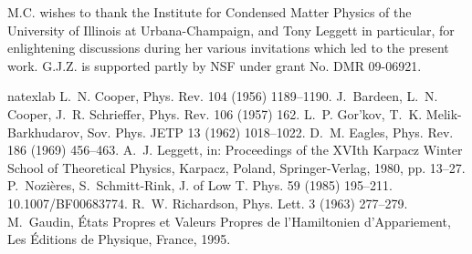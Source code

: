 \documentclass[5p,twocolumn]{elsarticle}
\begin{document}
M.C. wishes to thank the Institute for Condensed Matter Physics of the University of Illinois at
Urbana-Champaign, and Tony Leggett in particular, for enlightening discussions during her various invitations which led to the present work. G.J.Z. is supported partly by NSF under grant No. DMR 09-06921.  


%
\begin{thebibliography}{16}
\expandafter\ifx\csname natexlab\endcsname\relax\def\natexlab#1{#1}\fi
\providecommand{\bibinfo}[2]{#2}
\ifx\xfnm\relax \def\xfnm[#1]{\unskip,\space#1}\fi
\bibinfo{author}{L.~N. Cooper}, \bibinfo{journal}{Phys. Rev.}
  \bibinfo{volume}{104} (\bibinfo{year}{1956}) \bibinfo{pages}{1189--1190}.
\bibinfo{author}{J.~Bardeen}, \bibinfo{author}{L.~N. Cooper},
  \bibinfo{author}{J.~R. Schrieffer}, \bibinfo{journal}{Phys. Rev.}
  \bibinfo{volume}{106} (\bibinfo{year}{1957}) \bibinfo{pages}{162}.
\bibinfo{author}{L.~P. {Gor'kov}}, \bibinfo{author}{T.~K. Melik-Barkhudarov},
  \bibinfo{journal}{Sov. Phys. JETP} \bibinfo{volume}{13}
  (\bibinfo{year}{1962}) \bibinfo{pages}{1018--1022}.
\bibinfo{author}{D.~M. Eagles}, \bibinfo{journal}{Phys. Rev.}
  \bibinfo{volume}{186} (\bibinfo{year}{1969}) \bibinfo{pages}{456--463}.
\bibinfo{author}{A.~J. Leggett}, in: \bibinfo{booktitle}{Proceedings of the
  XVIth Karpacz Winter School of Theoretical Physics, Karpacz, Poland},
  \bibinfo{publisher}{Springer-Verlag}, \bibinfo{year}{1980}, pp.
  \bibinfo{pages}{13--27}.
\bibinfo{author}{P.~Nozi\`{e}res}, \bibinfo{author}{S.~Schmitt-Rink},
  \bibinfo{journal}{J. of Low T. Phys.} \bibinfo{volume}{59}
  (\bibinfo{year}{1985}) \bibinfo{pages}{195--211}.
  \bibinfo{note}{10.1007/BF00683774}.
\bibinfo{author}{R.~W. Richardson}, \bibinfo{journal}{Phys. Lett.}
  \bibinfo{volume}{3} (\bibinfo{year}{1963}) \bibinfo{pages}{277--279}.
\bibinfo{author}{M.~Gaudin}, \bibinfo{title}{{\'{E}tats Propres et Valeurs
  Propres de l'Hamiltonien d'Appariement}}, \bibinfo{publisher}{Les
  \'{E}ditions de Physique, France}, \bibinfo{year}{1995}.

\end{thebibliography}
\end{document}
